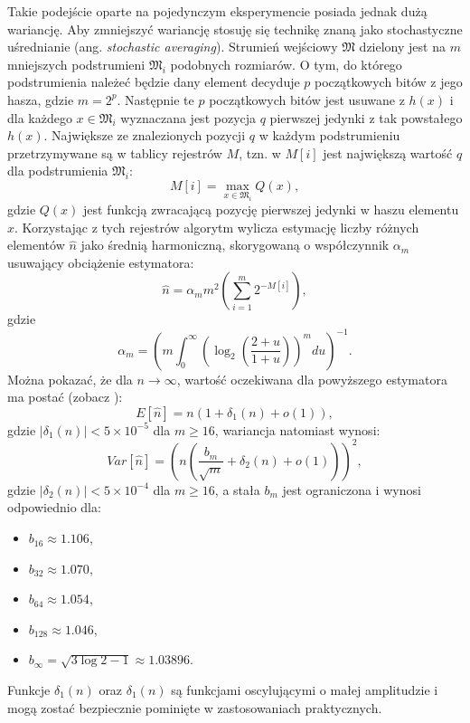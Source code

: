Takie podejście oparte na pojedynczym eksperymencie posiada jednak dużą wariancję. Aby zmniejszyć wariancję stosuję się technikę znaną jako stochastyczne uśrednianie (ang. \textit{stochastic averaging}). Strumień wejściowy $\mathfrak{M}$ dzielony jest na $m$ mniejszych podstrumieni $\mathfrak{M}_i$ podobnych rozmiarów. O tym, do którego podstrumienia należeć będzie dany element decyduje $p$ początkowych bitów z jego hasza, gdzie $m = 2^p$. Następnie te $p$ początkowych bitów jest usuwane z $h(x)$ i dla  każdego $x\in \mathfrak{M}_i$ wyznaczana jest pozycja $q$ pierwszej jedynki z tak powstałego $h(x)$. Największe ze znalezionych pozycji $q$ w każdym podstrumieniu przetrzymywane są w tablicy rejestrów $M$, tzn. w $M[i]$ jest największą  wartość $q$
dla podstrumienia $\mathfrak{M}_i$:
\begin{equation}
    M[i] = \max_{x \in \mathfrak{M}_i} Q(x),
\end{equation}
gdzie $Q(x)$ jest funkcją zwracającą  pozycję pierwszej jedynki w haszu elementu $x$.
 Korzystając z tych rejestrów algorytm wylicza estymację liczby różnych elementów $\hat{n}$
 jako średnią harmoniczną, skorygowaną o współczynnik ${\alpha}_{m}$ usuwający obciążenie estymatora:
\begin{equation}
    \hat{n} = {\alpha}_m{m}^{2}(\sum_{i=1}^{m} 2^{-M[i]}),
\end{equation}
gdzie
\begin{equation}
    {\alpha}_{m} = (m \int_{0}^{\infty} ({\log}_2(\frac{2 + u}{1 + u}))^m du)^{-1}.
\end{equation}
Można pokazać, że dla  $n \rightarrow \infty$, wartość oczekiwana dla powyższego estymatora ma postać (zobacz \cite{hll}):
\begin{equation}
    E[\hat{n}] = n(1 + {\delta}_1(n) + o(1)),
\end{equation}
gdzie $|{\delta}_1(n)| < 5 \times 10^{-5}$ dla $m \geq 16$, wariancja natomiast wynosi:
\begin{equation}
    Var[\hat{n}] = (n(\frac{{b}_m}{\sqrt{m}} + {\delta}_2(n) + o(1)))^2,
    \label{hll_var}
\end{equation}
 gdzie $|{\delta}_2(n)| < 5 \times 10^{-4}$ dla $m \geq 16$, a stała ${b}_m$ jest ograniczona i wynosi odpowiednio dla: 
 \begin{itemize}
 	\item ${b}_{16} \approx 1.106$, 
 	\item ${b}_{32} \approx 1.070$, 
 	\item ${b}_{64} \approx 1.054$, 
 	\item ${b}_{128} \approx 1.046$, 
 	\item ${b}_{\infty} = \sqrt{3\log{2} - 1} \approx 1.03896$. 
 \end{itemize}
 Funkcje ${\delta}_1(n)$ oraz ${\delta}_1(n)$ są funkcjami oscylującymi o małej amplitudzie i mogą zostać bezpiecznie pominięte w zastosowaniach praktycznych.

